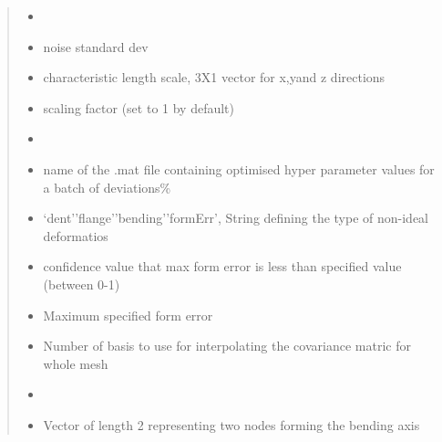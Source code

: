 \documentclass[a4paper,10pt,english]{sphinxmanual}
\begin{document}
\begin{fulllineitems}
\begin{quote}
\begin{description}
\begin{itemize}
\item {} 
 \textendash{} 

\item {} 
 \textendash{} noise standard dev

\item {} 
 \textendash{} characteristic length scale, 3X1 vector for x,yand z directions

\item {} 
 \textendash{} scaling factor (set to 1 by default)

\item {} 
 \textendash{} 

\item {} 
 \textendash{} name of the .mat file containing optimised hyper parameter values for a batch of deviations\%

\item {} 
 \textendash{} ‘dent’\textbar{}’flange’\textbar{}’bending’\textbar{}’formErr’, String defining the type of non-ideal deformatios

\item {} 
 \textendash{} confidence value that max form error is less than specified value (between 0-1)

\item {} 
 \textendash{} Maximum specified form error

\item {} 
 \textendash{} Number of basis to use for interpolating the covariance matric for whole mesh

\item {} 
 \textendash{} 

\item {} 
 \textendash{} Vector of length 2 representing two nodes forming the bending axis


\end{itemize}
\end{description}
\end{quote}
\end{fulllineitems}
\end{document}
